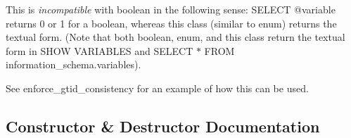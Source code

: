 This is {\itshape incompatible} with boolean in the following sense\+: \textquotesingle{}S\+E\+L\+E\+CT @variable\textquotesingle{} returns 0 or 1 for a boolean, whereas this class (similar to enum) returns the textual form. (Note that both boolean, enum, and this class return the textual form in S\+H\+OW V\+A\+R\+I\+A\+B\+L\+ES and S\+E\+L\+E\+CT $\ast$ F\+R\+OM information\+\_\+schema.\+variables).

See enforce\+\_\+gtid\+\_\+consistency for an example of how this can be used. 

\subsection{Constructor \& Destructor Documentation}
\mbox{\label{classSys__var__multi__enum_ac0836078707c904cf4bb8b08ab5fe1e8}} 
